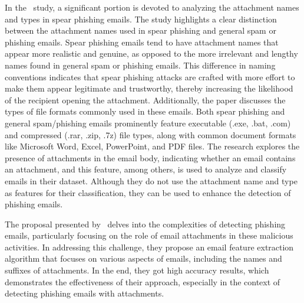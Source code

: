 In the~\citet{dewan2014analyzing} study, a significant portion is devoted to analyzing the attachment names and types in spear phishing emails. The study highlights a clear distinction between the attachment names used in spear phishing and general spam or phishing emails. Spear phishing emails tend to have attachment names that appear more realistic and genuine, as opposed to the more irrelevant and lengthy names found in general spam or phishing emails. This difference in naming conventions indicates that spear phishing attacks are crafted with more effort to make them appear legitimate and trustworthy, thereby increasing the likelihood of the recipient opening the attachment. Additionally, the paper discusses the types of file formats commonly used in these emails. Both spear phishing and general spam/phishing emails prominently feature executable (.exe, .bat, .com) and compressed (.rar, .zip, .7z) file types, along with common document formats like Microsoft Word, Excel, PowerPoint, and PDF files. The research explores the presence of attachments in the email body, indicating whether an email contains an attachment, and this feature, among others, is used to analyze and classify emails in their dataset. Although they do not use the attachment name and type as features for their classification, they can be used to enhance the detection of phishing emails.

The proposal presented by~\citet{li2020lstm} delves into the complexities of detecting phishing emails, particularly focusing on the role of email attachments in these malicious activities. In addressing this challenge, they propose an email feature extraction algorithm that focuses on various aspects of emails, including the names and suffixes of attachments. In the end, they got high accuracy results, which demonstrates the effectiveness of their approach, especially in the context of detecting phishing emails with attachments.

\begin{comment}
Therefore, it is crucial to not only inspect the declared \textbf{Content-Type} but also to perform a deeper analysis of the attachment itself. 
This can include scanning for known malware signatures, analyzing the file's actual content beyond its MIME declaration, and sandbox testing to observe the file's behavior when opened. By combining these techniques, a more robust and accurate detection of phishing attempts can be achieved, enhancing the security of email communication.
\end{comment}

